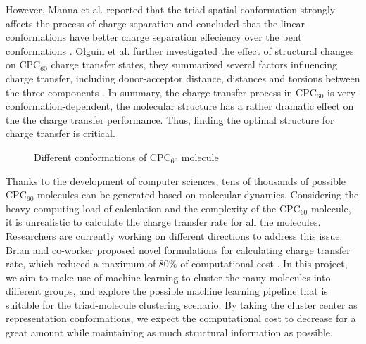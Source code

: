 \documentclass[a4paper]{article}
\begin{document}
However, Manna et al. reported that the triad spatial conformation strongly affects the process of charge separation and concluded that the linear conformations have better charge separation effeciency over the bent conformations \cite{MannaArun}. Olguin et al. further investigated the effect of structural changes on \(\text{CPC}_{60}\) charge transfer states, they summarized several factors influencing charge transfer, including donor-acceptor distance, distances and torsions between the three components \cite{OlguinMarco}. In summary, the charge transfer process in \(\text{CPC}_{60}\) is very conformation-dependent,  the molecular structure has a rather dramatic effect on the the charge transfer performance. Thus, finding the optimal structure for charge transfer is critical.

\begin{figure}[H]
    \centering
    \caption{Different conformations of \(\text{CPC}_{60}\) molecule}
    \label{fig:CPC60}
\end{figure}

Thanks to the development of computer sciences, tens of thousands of possible \(\text{CPC}_{60}\) molecules can be generated based on molecular dynamics. Considering the heavy computing load of calculation and the complexity of the \(\text{CPC}_{60}\) molecule, it is unrealistic to calculate the charge transfer rate for all the molecules. Researchers are currently working on different directions to address this issue. Brian and co-worker proposed novel formulations for calculating charge transfer rate, which reduced a maximum of 80\% of computational cost \cite{BrianDomi}. In this project, we aim to make use of machine learning to cluster the many molecules into different groups, and explore the possible machine learning pipeline that is suitable for the triad-molecule clustering scenario. By taking the cluster center as representation conformations, we expect the computational cost to decrease for a great amount while maintaining as much structural information as possible.
\end{document}
